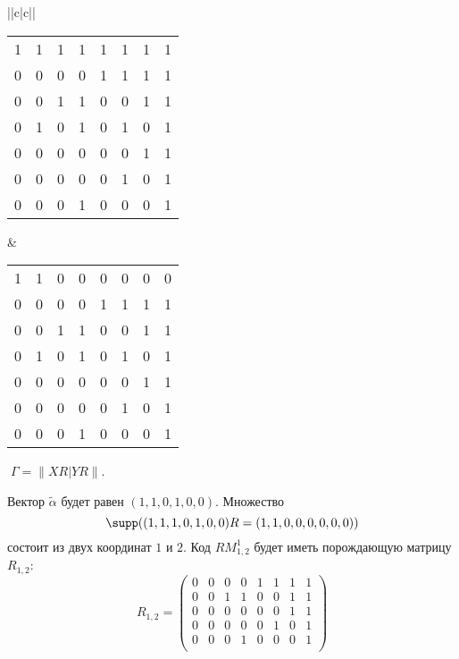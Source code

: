 \begin{tabular}{||c|c||}
\begin{tabular}{cccccccc}
1&1&1&1&1&1&1&1\\
0&0&0&0&1&1&1&1\\
0&0&1&1&0&0&1&1\\
0&1&0&1&0&1&0&1\\
0&0&0&0&0&0&1&1\\
0&0&0&0&0&1&0&1\\
0&0&0&1&0&0&0&1\\
\end{tabular}&
\begin{tabular}{cccccccc}
1&1&0&0&0&0&0&0\\
0&0&0&0&1&1&1&1\\
0&0&1&1&0&0&1&1\\
0&1&0&1&0&1&0&1\\
0&0&0&0&0&0&1&1\\
0&0&0&0&0&1&0&1\\
0&0&0&1&0&0&0&1\\
\end{tabular}
\end{tabular}$\;\Gamma=\|XR|YR\|$.
\vspace{10pt}

Вектор $\widetilde\alpha$ будет равен $(1,1,0,1,0,0)$. Множество
$$\supp((1,1,1,0,1,0,0)R=(1,1,0,0,0,0,0,0))$$ состоит из двух
координат $1$ и $2$. Код $RM^1_{1,2}$ будет иметь порождающую
матрицу $R_{1,2}$:
$$
R_{1,2}=\begin{pmatrix}
0&0&0&0&1&1&1&1\\
0&0&1&1&0&0&1&1\\
0&0&0&0&0&0&1&1\\
0&0&0&0&0&1&0&1\\
0&0&0&1&0&0&0&1\\
\end{pmatrix}
$$

